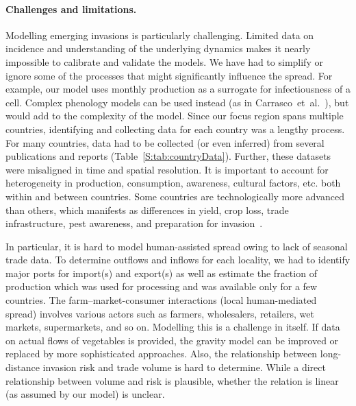 \documentclass[11pt]{article}
\theoremstyle{definition}
\begin{document}

\paragraph{Challenges and limitations.} Modelling emerging invasions is
particularly challenging. Limited data on incidence and understanding of
the underlying dynamics makes it nearly impossible to calibrate and
validate the models.   We have had to simplify or ignore some of the
processes that might significantly influence the spread.  For example, our
model uses monthly production as a surrogate for infectiousness of a cell.
Complex phenology models can be used instead (as in
Carrasco~et~al.~\cite{carrasco2010unveiling}), but would add to the
complexity of the model.
Since our focus region spans multiple countries, identifying and collecting
data for each country was a lengthy process. For many countries, data had
to be collected (or even inferred) from several publications and reports
(Table~\ref{S:tab:countryData}). Further, these datasets were misaligned in
time and spatial resolution.  It is important to account for heterogeneity
in production, consumption, awareness, cultural factors, etc. both within
and between countries.  Some countries are technologically more advanced
than others, which manifests as differences in yield, crop loss, trade
infrastructure, pest awareness, and preparation for
invasion~\cite{early2016global}.

In particular, it is hard to model human-assisted spread owing to lack of
seasonal trade data. To determine outflows and inflows for each locality,
we had to identify major ports for import(s) and export(s) as well as
estimate the fraction of production which was used for processing and was
available only for a few countries. The farm--market-consumer interactions
(local human-mediated spread) involves various actors such as farmers,
wholesalers, retailers, wet markets, supermarkets, and so on. Modelling
this is a challenge in itself. If data on actual flows of vegetables is
provided, the gravity model can be improved or replaced by more
sophisticated approaches. Also, the relationship between long-distance
invasion risk and trade volume is hard to determine. While a direct
relationship between volume and risk is plausible, whether the relation is
linear (as assumed by our model) is unclear.
\end{document}
